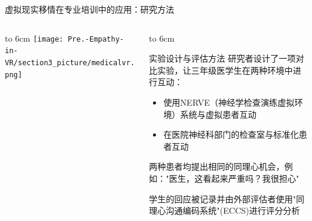 \documentclass[aspectratio=169,xcolor=dvipsnames]{beamer}
\begin{document}
\begin{frame}{虚拟现实移情在专业培训中的应用：研究方法}
    \begin{columns}[T]
        \begin{column}{0.45\textwidth}
            \vbox to 6cm{
                \vfill
                \centering
                \texttt{[image: Pre.-Empathy-in-VR/section3\_picture/medicalvr.png]}
                \vfill
            }
        \end{column}
        
        \begin{column}{0.55\textwidth}
            \vbox to 6cm{
                \vfill
                \begin{block}{实验设计与评估方法}
                    研究者设计了一项对比实验，让三年级医学生在两种环境中进行互动：
                    \begin{itemize}
                        \item 使用NERVE（神经学检查演练虚拟环境）系统与虚拟患者互动
                        \item 在医院神经科部门的检查室与标准化患者互动
                    \end{itemize}
                    
                    两种患者均提出相同的同理心机会，例如："医生，这看起来严重吗？我很担心"
                    
                    学生的回应被记录并由外部评估者使用"同理心沟通编码系统"(ECCS)进行评分分析
                \end{block}
                \vfill
            }
        \end{column}
    \end{columns}
\end{frame}
\end{document}
